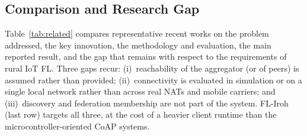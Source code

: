 \documentclass[a4paper,fleqn]{cas-dc}
\begin{document}
\subsection{Comparison and Research Gap}

Table~\ref{tab:related} compares representative recent works on the problem addressed, the key innovation, the methodology and evaluation, the main reported result, and the gap that remains with respect to the requirements of rural IoT FL. Three gaps recur: (i)~reachability of the aggregator (or of peers) is assumed rather than provided; (ii)~connectivity is evaluated in simulation or on a single local network rather than across real NATs and mobile carriers; and (iii)~discovery and federation membership are not part of the system. FL-Iroh (last row) targets all three, at the cost of a heavier client runtime than the microcontroller-oriented CoAP systems.
\end{document}
